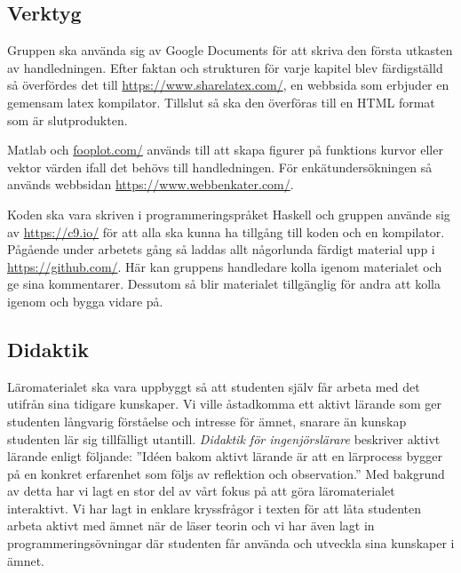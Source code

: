 \documentclass[]{article}
\begin{document}
\subsection{Verktyg}%
Gruppen ska använda sig av Google Documents för att skriva den första utkasten
av handledningen. Efter faktan och strukturen för varje kapitel blev
färdigställd så överfördes det till \url{https://www.sharelatex.com/},
en webbsida som erbjuder en gemensam latex kompilator.
Tillslut så ska den överföras till en HTML format som är slutprodukten.

Matlab och \url{fooplot.com/} används till att skapa figurer på funktions
kurvor eller vektor värden ifall det behövs till handledningen.
För enkätundersökningen så används webbsidan \url{https://www.webbenkater.com/}.

Koden ska vara skriven i programmeringspråket Haskell och gruppen använde sig
av \url{https://c9.io/} för att alla ska kunna ha tillgång till koden och en
kompilator.
Pågående under arbetets gång så laddas allt någorlunda färdigt material upp i \url{https://github.com/}. Här kan gruppens handledare kolla igenom materialet och ge sina kommentarer. Dessutom så blir materialet tillgänglig för andra att kolla igenom och bygga vidare på. 


\subsection{Didaktik}
Läromaterialet ska vara uppbyggt så att studenten själv får arbeta med det utifrån sina tidigare 
kunskaper. Vi ville åstadkomma ett aktivt lärande som ger studenten långvarig förståelse och 
intresse för ämnet, snarare än kunskap studenten lär sig tillfälligt utantill. \textit{Didaktik för 
ingenjörslärare} beskriver aktivt lärande enligt följande: ”Idéen bakom aktivt lärande är att en 
lärprocess bygger på en konkret erfarenhet som följs av reflektion och observation.” Med bakgrund av 
detta har vi lagt en stor del av vårt fokus på att göra läromaterialet interaktivt. Vi har lagt in 
enklare kryssfrågor i texten för att låta studenten arbeta aktivt med ämnet när de läser teorin och 
vi har även lagt in programmeringsövningar där studenten får använda och utveckla sina kunskaper i 
ämnet.
\end{document}
